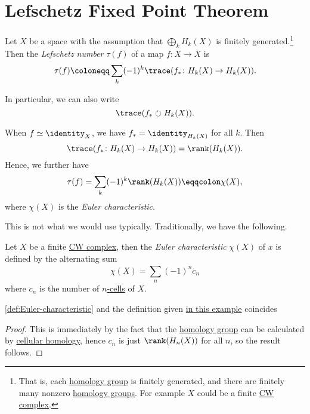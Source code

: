 \section{Lefschetz Fixed Point Theorem}
\begin{definition}\label{def:Lefschetz-number}
	Let \(X\) be a space with the assumption that \(\bigoplus_k H_k(X)\) is finitely generated.\footnote{That is, each \hyperref[def:homology-group]{homology group}
		is finitely	generated, and there are finitely many nonzero \hyperref[def:homology-group]{homology groups}.
		For example \(X\) could be a finite \hyperref[def:CW-Complex]{CW complex}.}
	Then the \emph{Lefschetz number} \(\tau(f)\) of a map \(f \colon X \to X\) is
	\[
		\tau(f) \coloneqq \sum_k (-1)^k \trace(f_\ast \colon H_k(X) \to H_k(X)).
	\]
\end{definition}
\begin{remark}
	In particular, we can also write
	\[
		\trace(f_{\ast} \circlearrowright H_{k} (X)).
	\]
\end{remark}

\begin{eg}\label{eg:lec-36}
	When \(f \simeq \identity _X\), we have \(f_\ast = \identity_{H_k(X)}\) for all \(k\).
	Then
	\[
		\trace(f_\ast \colon H_k(X) \to H_k(X)) = \rank(H_k(X)).
	\]
	Hence, we further have
	\[
		\tau(f) = \sum_k (-1)^k\rank(H_k(X)) \eqqcolon \chi(X),
	\]
	where \(\chi(X)\) is the \emph{Euler characteristic}.
\end{eg}

This is not what we would use typically. Traditionally, we have the following.
\begin{definition}\label{def:Euler-characteristic}
	Let \(X\) be a finite \hyperref[def:CW-Complex]{CW complex},
	then the \emph{Euler characteristic} \(\chi (X)\) of \(x\) is defined by the alternating sum
	\[
		\chi (X) = \sum_{n}^{} (-1)^{n} c_{n}
	\]
	where \(c_{n} \) is the number of \hyperref[def:cell]{\(n\)-cells} of \(X\).
\end{definition}

\begin{proposition}
	\autoref{def:Euler-characteristic} and the definition given \hyperref[eg:lec-36]{in this example} coincides
\end{proposition}
\begin{proof}
	This is immediately by the fact that the \hyperref[def:homology-group]{homology group} can be calculated by \hyperref[def:cellular-homology-group]{cellular homology},
	hence \(c_{n}\) is just \(\rank(H_{n} (X))\) for all \(n\), so the result follows.
\end{proof}

